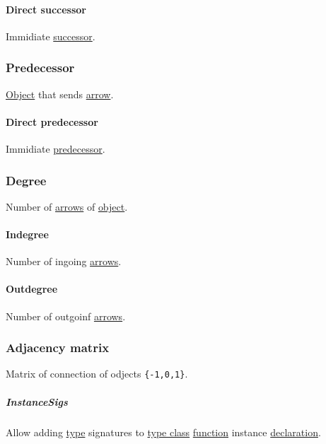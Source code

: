 \documentclass[11pt]{article}
\begin{document}
\paragraph{\label{org63728bf}Direct successor}
\label{sec:orga65c414}
Immidiate \hyperref[org67c0a70]{successor}.\\

\subsubsection{\label{org9b8b7f5}Predecessor}
\label{sec:org97124e9}
\hyperref[org4be0e9d]{Object} that sends \hyperref[org03967f4]{arrow}.\\

\paragraph{\label{org5994231}Direct predecessor}
\label{sec:org5bcf09d}
Immidiate \hyperref[org9b8b7f5]{predecessor}.\\


\subsubsection{\label{orgd59f63d}Degree}
\label{sec:org933cf66}
Number of \hyperref[org9c45dc6]{arrows} of \hyperref[org4be0e9d]{object}.\\

\paragraph{\label{org7279d85}Indegree}
\label{sec:org2f8ab5e}
Number of ingoing \hyperref[org9c45dc6]{arrows}.\\

\paragraph{\label{org58b68fb}Outdegree}
\label{sec:orgcdec2cb}
Number of outgoinf \hyperref[org9c45dc6]{arrows}.\\

\subsubsection{\label{org423d2f0}Adjacency matrix}
\label{sec:org7023573}
Matrix of connection of odjects \texttt{\{-1,0,1\}}.\\

\subparagraph{\label{org5fa35dc}InstanceSigs}
\label{sec:org92f705d}
Allow adding \hyperref[orgc4aea2f]{type} signatures to \hyperref[org16d8a26]{type class} \hyperref[orge15bc14]{function} instance \hyperref[org8fbd848]{declaration}.\\
\end{document}
